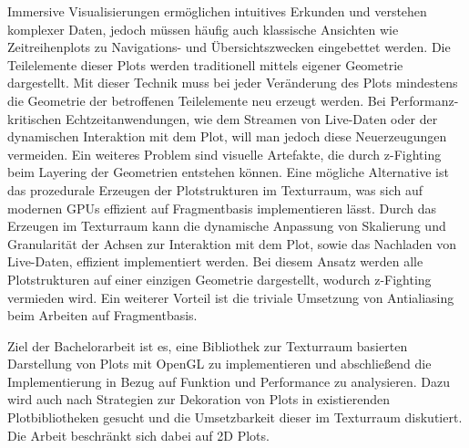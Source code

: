 


\begin{task}[] %
	\smallskip
	Immersive Visualisierungen ermöglichen intuitives Erkunden und verstehen komplexer Daten,
	jedoch müssen häufig auch klassische Ansichten wie Zeitreihenplots zu Navigations- und Übersichtszwecken
	eingebettet werden. Die Teilelemente dieser Plots werden traditionell mittels eigener Geometrie dargestellt.
	Mit dieser Technik muss bei jeder Veränderung des Plots mindestens die Geometrie der betroffenen
	Teilelemente neu erzeugt werden. Bei Performanz-kritischen Echtzeitanwendungen, wie dem Streamen von
	Live-Daten oder der dynamischen Interaktion mit dem Plot, will man jedoch diese Neuerzeugungen vermeiden.
	Ein weiteres Problem sind visuelle Artefakte, die durch z-Fighting beim Layering der Geometrien entstehen können.
	Eine mögliche Alternative ist das prozedurale Erzeugen der Plotstrukturen im Texturraum,
	was sich auf modernen GPUs effizient auf Fragmentbasis implementieren lässt. Durch das Erzeugen im
	Texturraum kann die dynamische Anpassung von Skalierung und Granularität der Achsen zur Interaktion mit
	dem Plot, sowie das Nachladen von Live-Daten, effizient implementiert werden. Bei diesem Ansatz werden
	alle Plotstrukturen auf einer einzigen Geometrie dargestellt, wodurch z-Fighting vermieden wird.
	Ein weiterer Vorteil ist die triviale Umsetzung von Antialiasing beim Arbeiten auf Fragmentbasis.
	
	\smallskip	
	Ziel der Bachelorarbeit ist es, eine Bibliothek zur Texturraum basierten Darstellung von Plots mit
	OpenGL zu implementieren und abschließend die Implementierung in Bezug auf Funktion und Performance
	zu analysieren. Dazu wird auch nach Strategien zur Dekoration von Plots in existierenden Plotbibliotheken
	gesucht und die Umsetzbarkeit dieser im Texturraum diskutiert. Die Arbeit beschränkt sich dabei auf 2D Plots.
	
	\newpage	
	

\end{task}
